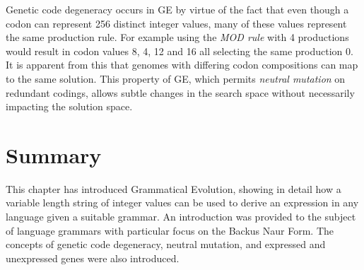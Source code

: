 Genetic code degeneracy occurs in GE by virtue of the fact that even though a codon can represent 256 distinct integer values, many of these values represent the same production rule. For example using the \emph{MOD rule} with 4 productions would result in codon values 8, 4, 12 and 16 all selecting the same production 0. It is apparent from this that genomes with differing codon compositions can map to the same solution.
This property of GE, which permits \emph {neutral mutation} on redundant codings, allows subtle changes in the search space without necessarily impacting the solution space.



\section{Summary}
This chapter has introduced Grammatical Evolution, showing in detail how a variable length string of integer values can be used to derive an expression in any language given a suitable grammar. An introduction was provided to the subject of language grammars with particular focus on the Backus Naur Form. The concepts of genetic code degeneracy, neutral mutation, and expressed and unexpressed genes were also introduced. 












